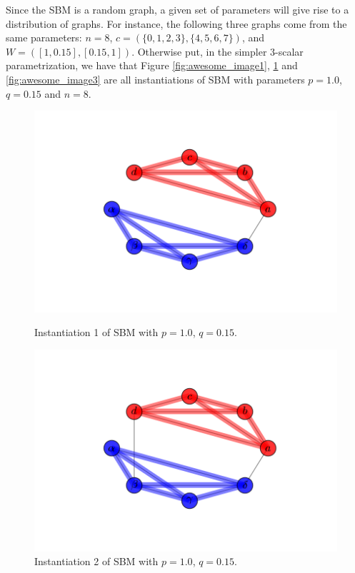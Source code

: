Since the SBM is a random graph, a given set of parameters will give rise to a distribution of graphs.  For instance, the following three graphs come from the same parameters: $n = 8$, $c = (\{0,1,2,3\}, \{4,5,6,7\})$, and $W =([1,0.15],[0.15,1])$. Otherwise put, in the simpler $3$-scalar parametrization, we have that Figure \ref{fig:awesome_image1}, \ref{fig:awesome_image2} and \ref{fig:awesome_image3} are all instantiations of SBM with parameters $p=1.0$, $q=0.15$ and $n=8$.  
\begin{figure}[h]
  \includegraphics[width=\linewidth]{labels_and_colors_1.png}
  \caption{Instantiation 1 of SBM with $p=1.0$, $q=0.15$.}\label{fig:awesome_image1}
\endminipage\hfill
{}
  \includegraphics[width=\linewidth]{labels_and_colors_2.png}
  \caption{Instantiation 2 of SBM with $p=1.0$, $q=0.15$.}\label{fig:awesome_image2}
\endminipage\hfill

\end{figure}
